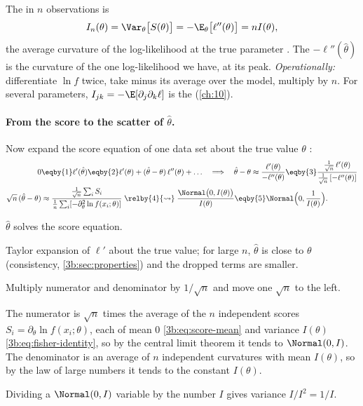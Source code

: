 \begin{workdef}
The  in $n$ observations is
\[
  I_n(\theta)=\Var_\theta\bigl[S(\theta)\bigr]=-\E_\theta\bigl[\ell''(\theta)\bigr]=nI(\theta),
\]
the average curvature of the log-likelihood at the true parameter
. The 
$-\ell''(\hat\theta)$ is the curvature of the one log-likelihood we have,
at its peak. \emph{Operationally:} differentiate $\ln f$ twice, take minus
its average over the model, multiply by $n$. For several parameters,
$I_{jk}=-\E[\partial_j\partial_k\ell]$ is the 
(\cref{ch:10}).
\end{workdef}

\paragraph{From the score to the scatter of $\hat\theta$.}
Now expand the score equation of one data set about the true value
$\theta$ :
\begin{align}
  0&\eqby{1}\ell'(\hat\theta)
   \eqby{2}\ell'(\theta)+(\hat\theta-\theta)\,\ell''(\theta)+\dots
  \quad\Longrightarrow\quad
  \hat\theta-\theta\approx\frac{\ell'(\theta)}{-\ell''(\theta)}
  \eqby{3}\frac{\tfrac1{\sqrt n}\,\ell'(\theta)}{\tfrac1{\sqrt n}\,[-\ell''(\theta)]}
  \nonumber\\
  \sqrt n\,(\hat\theta-\theta)
  &\approx\frac{\frac{1}{\sqrt n}\sum_iS_i}{\frac1n\sum_i[-\partial^2_\theta\ln f(x_i;\theta)]}
  \;\relby{4}{\rightsquigarrow}\;\frac{\Normal\bigl(0,I(\theta)\bigr)}{I(\theta)}
  \eqby{5}\Normal\Bigl(0,\frac1{I(\theta)}\Bigr).
  \label{3b:eq:asymptotic}
\end{align}
\begin{explain}
  \item $\hat\theta$ solves the score equation.
  \item Taylor expansion of $\ell'$ about the true value; for large $n$,
        $\hat\theta$ is close to $\theta$ (consistency,
        \cref{3b:sec:properties}) and the dropped terms are smaller.
  \item Multiply numerator and denominator by $1/\sqrt n$ and move one
        $\sqrt n$ to the left.
  \item The numerator is $\sqrt n$ times the average of the $n$ independent
        scores $S_i=\partial_\theta\ln f(x_i;\theta)$, each of mean $0$
        \eqref{3b:eq:score-mean} and variance $I(\theta)$
        \eqref{3b:eq:fisher-identity}, so by the central limit theorem it
        tends to $\Normal(0,I)$. The denominator is an average of $n$
        independent curvatures with mean $I(\theta)$, so by the law of
        large numbers it tends to the constant $I(\theta)$.
  \item Dividing a $\Normal(0,I)$ variable by the number $I$ gives variance
        $I/I^2=1/I$.
\end{explain}
